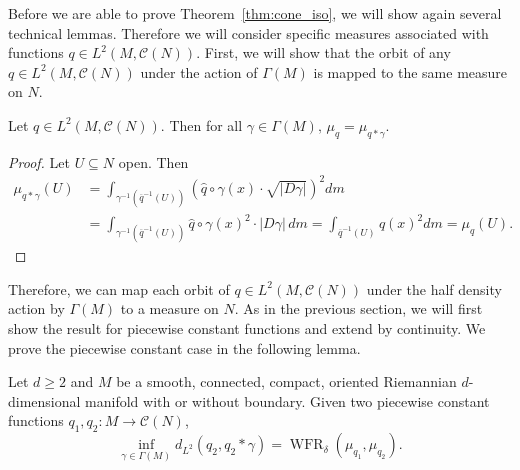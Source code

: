 \documentclass[final,hidelinks,onefignum,onetabnum]{siamart220329}
\newcommand{\WFR}{\operatorname{WFR}}
\begin{document}
Before we are able to prove Theorem~\ref{thm:cone_iso}, we will show again several technical lemmas. Therefore we will consider specific measures associated with functions $q\in L^2(M,\mathcal{C}(N))$. First, we will show that the orbit of any $q\in L^2(M,\mathcal{C}(N))$ under the action of $\Gamma(M)$ is mapped to the same measure on $N$.
\begin{lemma}
Let $q\in L^2(M,\mathcal{C}(N))$. Then for all $\gamma\in \Gamma(M),\,\mu_{q}=\mu_{q*\gamma}.$
\end{lemma}
\begin{proof}
Let $U\subseteq N$ open. Then
\begin{align*}
    \mu_{q*\gamma}(U)&=\int_{\gamma^{-1}(\overline{q}^{-1}(U))} (\hat{q}\circ{\gamma}(x)\cdot\sqrt{|D\gamma|})^2dm\\
    &=\int_{\gamma^{-1}(\overline{q}^{-1}(U))} \hat{q}\circ{\gamma}(x)^2\cdot|D\gamma|\,dm=\int_{\overline{q}^{-1}(U)} \hat{q}(x)^2dm=\mu_{q}(U).
\end{align*}
\end{proof}
\noindent Therefore, we can map each orbit of $q\in L^2(M,\mathcal{C}(N))$ under the half density action by $\Gamma(M)$ to a measure on $N$. 
\noindent As in the previous section, we will first show the result for piecewise constant functions and extend by continuity. We prove the piecewise constant case in the following lemma.
\begin{lemma}\label{lem:cone_iso_dense}
Let $d\geq 2$ and $M$ be a smooth, connected, compact, oriented Riemannian $d$-dimensional manifold with or without boundary. Given two piecewise constant functions $q_1,q_2:M\to \mathcal{C}(N)$, 
\begin{equation*}
    \inf_{\gamma \in \Gamma(M)} d_{L^2}(q_2,q_2*\gamma)=\WFR_\delta(\mu_{q_1},\mu_{q_2}).
\end{equation*}
\end{lemma}
\end{document}
